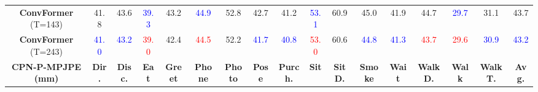\documentclass{article}
\begin{document}
\begin{table*}[!htb]
{\begin{tabular}{*{17}{|c}|}
 \hline
 \textbf{ConvFormer} (T=143) & 41.8 & 43.6 & \textcolor{blue}{39.3} & 43.2 & \textcolor{blue}{44.9} & 52.8 & 42.7 & 41.2 & \textcolor{blue}{53.1} & 60.9 & 45.0 & 41.9 & 44.7 & \textcolor{blue}{29.7} & 31.1 & 43.7 \\

 \textbf{ConvFormer} (T=243) & \textcolor{blue}{41.0} & \textcolor{blue}{43.2} & \textcolor{red}{39.0} & 42.4 & \textcolor{red}{44.5} & 52.2 & \textcolor{blue}{41.7} & \textcolor{blue}{40.8} & \textcolor{red}{53.0} & 60.6 & \textcolor{blue}{44.8} & \textcolor{blue}{41.3} & \textcolor{red}{43.7} & \textcolor{red}{29.6} & \textcolor{blue}{30.9} & \textcolor{blue}{43.2} \\
\hline


  \textbf{CPN-P-MPJPE (mm)} &\textbf{Dir.} & \textbf{Disc.} & \textbf{Eat} & \textbf{Greet} & \textbf{Phone} & \textbf{Photo} & \textbf{Pose}  & \textbf{Purch.} & \textbf{Sit} & \textbf{SitD.} & \textbf{Smoke} & \textbf{Wait} & \textbf{WalkD.} & \textbf{Walk}  & \textbf{WalkT.} & \textbf{Avg.} \\


\end{tabular}}
\end{table*}
\end{document}
